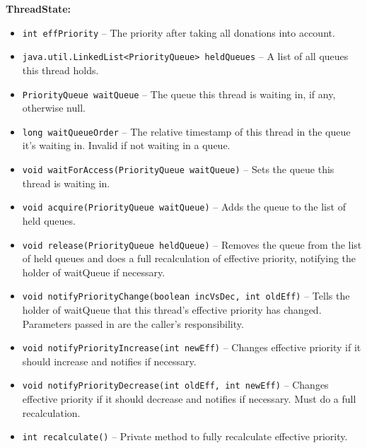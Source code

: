 \documentclass{article}
\begin{document}
\noindent\textbf{ThreadState:} \begin{itemize}
\item \texttt{int effPriority} -- The priority after taking all donations into account.
\item \texttt{java.util.LinkedList<PriorityQueue> heldQueues} -- A list of all queues this thread holds.
\item \texttt{PriorityQueue waitQueue} -- The queue this thread is waiting in, if any, otherwise null.
\item \texttt{long waitQueueOrder} -- The relative timestamp of this thread in the queue it's waiting in. Invalid if not waiting in a queue.
\item \texttt{void waitForAccess(PriorityQueue waitQueue)} -- Sets the queue this thread is waiting in.
\item \texttt{void acquire(PriorityQueue waitQueue)} -- Adds the queue to the list of held queues.
\item \texttt{\textcolor{\changecolor}{void release(PriorityQueue heldQueue)}} -- Removes the queue from the list of held queues and does a full recalculation of effective priority, notifying the holder of waitQueue if necessary.
\item \texttt{void notifyPriorityChange(boolean incVsDec, int oldEff)} -- Tells the holder of waitQueue that this thread's effective priority has changed. Parameters passed in are the caller's responsibility.
\item \texttt{void notifyPriorityIncrease(int newEff)} -- Changes effective priority if it should increase and notifies if necessary.
\item \texttt{\textcolor{\changecolor}{void notifyPriorityDecrease(int oldEff, int newEff)}} -- Changes effective priority if it should decrease and notifies if necessary. Must do a full recalculation.
\item \texttt{\textcolor{\changecolor}{int recalculate()}} -- Private method to fully recalculate effective priority.
\end{itemize}
\end{document}
